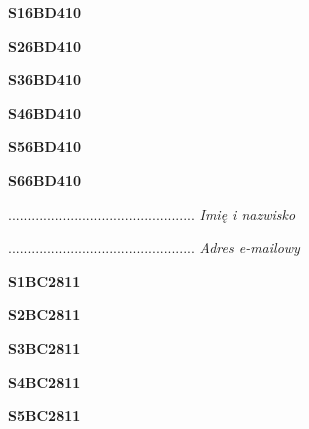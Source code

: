 \begin{turn}{90}\huge \textbf{S16BD410}\end{turn}

\begin{turn}{90}\huge \textbf{S26BD410}\end{turn}

\begin{turn}{90}\huge \textbf{S36BD410}\end{turn}

\begin{turn}{90}\huge \textbf{S46BD410}\end{turn}

\begin{turn}{90}\huge \textbf{S56BD410}\end{turn}

\begin{turn}{90}\huge \textbf{S66BD410}\end{turn}

\begin{turn}{90}\begin{minipage}{\linewidth} \vspace{20mm} ................................................  \textit{Imię i nazwisko}\end{minipage}\end{turn}

\begin{turn}{90}\begin{minipage}{\linewidth} \vspace{20mm} ................................................  \textit{Adres e-mailowy}\end{minipage}\end{turn}

\begin{turn}{90}\huge \textbf{S1BC2811}\end{turn}

\begin{turn}{90}\huge \textbf{S2BC2811}\end{turn}

\begin{turn}{90}\huge \textbf{S3BC2811}\end{turn}

\begin{turn}{90}\huge \textbf{S4BC2811}\end{turn}

\begin{turn}{90}\huge \textbf{S5BC2811}\end{turn}

